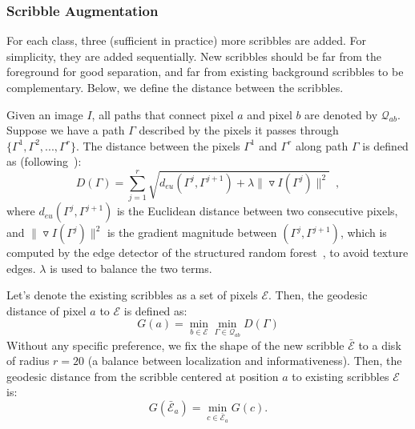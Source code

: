 
\subsubsection{Scribble Augmentation}

For each class, three (sufficient in practice) more scribbles are
added. For simplicity, they are added sequentially.  New scribbles
should be far from the foreground for good separation, and far from
existing background scribbles to be complementary.  Below, we define
the distance between the scribbles.

Given an image $I$, all paths that connect pixel $a$ and pixel $b$ are
denoted by $\mathcal{Q}_{ab}$.  Suppose we have a path $\Gamma$
described by the pixels it passes through $\{ \Gamma^1, \Gamma^2,...,
\Gamma^r\}$. The distance between the pixels $\Gamma^1$ and $\Gamma^r$
along path $\Gamma$ is defined as (following~\citep{geodesic:star}):
\begin{equation}
  \label{eq:gdist}
  D(\Gamma) = \sum_{j=1}^{r} \sqrt{ d_{eu}(\Gamma^j, \Gamma^{j+1}) + \lambda \| \triangledown I(\Gamma^j)\|^2}  \enspace ,
\end{equation}
where $d_{eu}(\Gamma^j, \Gamma^{j+1})$ is the Euclidean distance
between two consecutive pixels, and $\| \triangledown I(\Gamma^j)\|^2$
is the gradient magnitude between $(\Gamma^j,\Gamma^{j+1})$, which is
computed by the edge detector of the structured random
forest~\citep{edge:srf}, to avoid texture edges. $\lambda$ is used to
balance the two terms.

Let's denote the existing scribbles as a set of pixels
$\mathcal{E}$. Then, the geodesic distance of pixel $a$ to $\mathcal{E}$ is defined as:
\begin{equation}
  \label{eq:gdist2}
  G(a) =  \min_{b\in \mathcal{E}}  \min_{\Gamma \in \mathcal{Q}_{ab}} D(\Gamma) 
\end{equation}
Without any specific preference, we fix the shape of the new scribble
$\bar{\mathcal{E}}$ to a disk of radius $r=20$ (a balance between
localization and informativeness). Then, the geodesic distance from
the scribble centered at position $a$ to existing scribbles
$\mathcal{E}$ is:
\begin{equation}
  \label{eq:gdist:set}
  G(\bar{\mathcal{E}}_a)  =  \min_{c \in \bar{\mathcal{E}}_a} G(c).
\end{equation}


